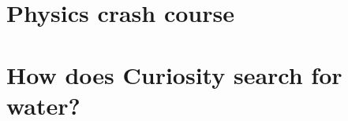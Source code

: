 \documentclass[DIV=calc, paper=a4, fontsize=12pt]{scrartcl}	 %
\begin{document}
\begin{multicols}{2}






\section*{Physics crash course}



















\section*{How does Curiosity search for water?}













\end{multicols}
\end{document}
